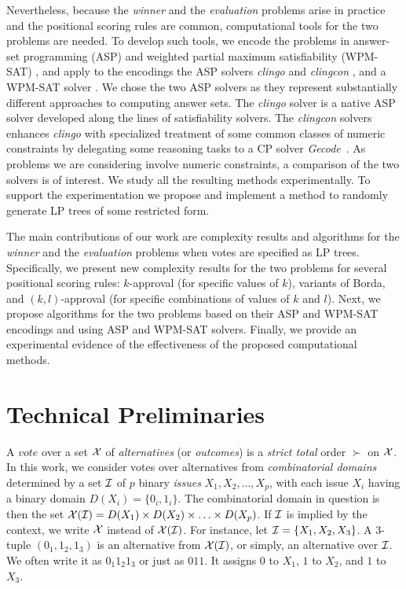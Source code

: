 Nevertheless, because the \emph{winner} and the \emph{evaluation}
problems arise in practice and the positional scoring rules
are common, computational tools for the two problems are needed. To 
develop such tools, we encode the problems in answer-set programming (ASP) 
\cite{mt99:stable,Niemela:1999} and weighted partial maximum satisfiability 
(WPM-SAT) \cite{ansotegui2010new,ansotegui2009solving}, and apply to the 
encodings the ASP solvers \emph{clingo} \cite{Gebser:clingo} and 
\emph{clingcon} \cite{Ostrowski:clingcon}, and a WPM-SAT solver \toulbar 
\cite{toulbar2}. We chose the two ASP solvers as they represent substantially
different approaches to computing answer sets. The \emph{clingo} solver is 
a native ASP solver developed along the lines of satisfiability solvers. 
The \emph{clingcon} solvers enhances \emph{clingo} with specialized 
treatment of some common classes of numeric constraints by delegating some 
reasoning tasks to a CP solver \emph{Gecode}~\cite{Schulte:gecode}. As 
problems we are considering involve numeric constraints, a comparison of 
the two solvers is of interest. We study all the resulting methods 
experimentally. To support the experimentation we propose and implement 
a method to randomly generate LP trees of some restricted form.

The main contributions of our work are complexity results and algorithms 
for the \emph{winner} and the \emph{evaluation} problems when votes are 
specified as LP trees. Specifically, we present new complexity results 
for the two problems for several positional scoring rules: $k$-approval 
(for specific values of $k$), variants of Borda, and $(k,l)$-approval 
(for specific combinations of values of $k$ and $l$). Next, we propose
algorithms for the two problems based on their ASP and WPM-SAT encodings 
and using ASP and WPM-SAT solvers. Finally, we provide an experimental 
evidence of the effectiveness of the proposed computational methods.

\section{Technical Preliminaries}

A $\mathit{vote}$ over a set $\mathcal{X}$ of \emph{alternatives} (or 
\emph{outcomes}) is a \emph{strict total} order $\succ$ on $\mathcal{X}$.
In this work, we consider votes over alternatives from \emph{combinatorial
domains} determined by a set $\mathcal{I}$ of $p$ binary \emph{issues} $X_1, X_2,
\ldots,X_p$, with each issue $X_i$ having a binary domain $D(X_i) = 
\{0_i, 1_i\}$. The combinatorial domain in question is then the set 
$\mathcal{X}(\mathcal{I})=D(X_1) \times 
D(X_2) \times \ldots\times D(X_p)$. If $\mathcal{I}$ is implied by the context, 
we write $\mathcal{X}$ instead of $\mathcal{X}(\mathcal{I})$. For instance, let $\mathcal{I} = \{X_1, X_2, 
X_3\}$. A 3-tuple $(0_1,1_2,1_3)$ is an alternative from $\mathcal{X}(\mathcal{I})$,
or simply, an alternative over $\mathcal{I}$. We 
often write it as $0_1 1_2 1_3$ or just as $011$. It assigns $0$ to 
$X_1$, $1$ to $X_2$, and $1$ to $X_3$.  


